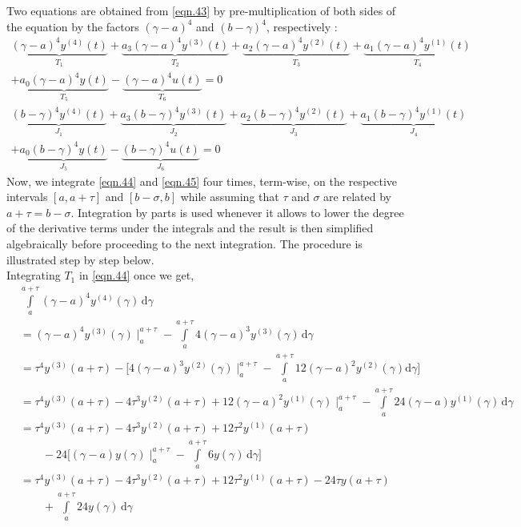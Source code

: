 \documentclass{article}
\begin{document}
Two equations are obtained from \eqref{eqn.43}  by pre-multiplication of both sides of the equation by the factors $(\gamma-a)^4$ and $(b-\gamma)^4$, respectively :
\begin{equation}\label{eqn.44}	
\begin{split}
	\underbrace{(\gamma-a)^{4}y^{(4)}(t)}_\text{$T_1$} + \underbrace{a_{3}(\gamma-a)^{4}y^{(3)}(t)}_\text{$T_2$} + \underbrace{a_{2}(\gamma-a)^{4}y^{(2)}(t)}_\text{$T_3$} + \underbrace{a_{1}(\gamma-a)^{4}y^{(1)}(t)}_\text{$T_4$}\\ +\underbrace{a_{0}(\gamma-a)^{4}y(t)}_\text{$T_5$} - \underbrace{(\gamma-a)^{4}u(t)}_\text{$T_6$} = 0
\end{split}
\end{equation}
\begin{equation}\label{eqn.45}	
\begin{split}
	\underbrace{(b-\gamma)^{4}y^{(4)}(t)}_\text{$J_1$} + \underbrace{a_{3}(b-\gamma)^{4}y^{(3)}(t)}_\text{$J_2$} + \underbrace{a_{2}(b-\gamma)^{4}y^{(2)}(t)}_\text{$J_3$} + \underbrace{a_{1}(b-\gamma)^{4}y^{(1)}(t)}_\text{$J_4$}\\ +\underbrace{a_{0}(b-\gamma)^{4}y(t)}_\text{$J_5$} - \underbrace{(b-\gamma)^{4}u(t)}_\text{$J_6$} = 0
\end{split}
\end{equation}
Now, we integrate \eqref{eqn.44} and \eqref{eqn.45} four times, term-wise, on the respective intervals $[a, a+\tau]$ and $[b-\sigma, b]$ while assuming that $\tau$ and $\sigma$ are related by $a+\tau=b-\sigma$. Integration by parts is used whenever it allows to lower the degree of the derivative terms under the integrals and the result is then simplified algebraically before proceeding to the next integration. The procedure is illustrated step by step below.\\
Integrating $T_1$ in \eqref{eqn.44} once we get,
\begin{equation}\label{eqn.46}
\begin{split}
	&\int\limits_{a}^{a+\tau}(\gamma-a)^4 y^{(4)}(\gamma)\, \mathrm{d}\gamma\\
	& = (\gamma-a)^4 y^{(3)}(\gamma)\mid_a^{a+\tau} - \int\limits_{a}^{a+\tau} 4(\gamma-a)^3 y^{(3)}(\gamma)\, \mathrm{d}\gamma \\
	& =  \tau^4 y^{(3)}(a+\tau) - \bigg[ 4(\gamma-a)^3 y^{(2)}(\gamma) \mid_a^{a+\tau} - \int\limits_a^{a+\tau} 12(\gamma-a)^{2} y^{(2)}(\gamma) \mathrm{d}\gamma \bigg]\\
	& = \tau^4 y^{(3)}(a+\tau) - 4\tau^3 y^{(2)}(a+\tau) + 12(\gamma-a)^{2}y^{(1)}(\gamma) \mid_a^{a+\tau} - \int\limits_a^{a+\tau} 24(\gamma-a) y^{(1)}(\gamma)\, \mathrm{d}\gamma\\
	& = \tau^4 y^{(3)}(a+\tau) - 4\tau^3 y^{(2)}(a+\tau) + 12\tau^2 y^{(1)}(a+\tau) \\&\qquad{}- 24\bigg[(\gamma-a)y(\gamma)\mid_a^{a+\tau}-\int\limits_a^{a+\tau} 6 y(\gamma)\, \mathrm{d}\gamma\bigg]\\
	& = \tau^4 y^{(3)}(a+\tau) - 4\tau^3 y^{(2)}(a+\tau) + 12\tau^2 y^{(1)}(a+\tau) - 24\tau y(a+\tau)\\&\qquad{}+\int\limits_a^{a+\tau} 24 y(\gamma)\, \mathrm{d}\gamma
\end{split}
\end{equation}
\end{document}
